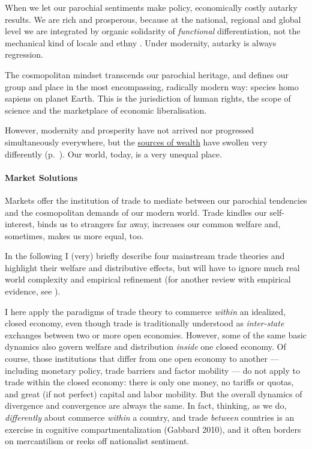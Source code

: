 When we let our parochial sentiments make policy, economically costly autarky results.
We are rich and prosperous, because at the national, regional and global level we are integrated by organic solidarity of \emph{functional} differentiation, not the mechanical kind of locale and ethny \citep{Durkheim-1893-aa}.
Under modernity, autarky is always regression.

The cosmopolitan mindset transcends our parochial heritage, and defines our group and place in the most encompassing, radically modern way:
species homo sapiens on planet Earth.
This is the jurisdiction of human rights, the scope of science and the marketplace of economic liberalisation.

However, modernity and prosperity have not arrived nor progressed simultaneously everywhere, but the  \hyperref[sec:sources-of-wealth]{sources of wealth} have swollen very differently (p.~\pageref{sec:sources-of-wealth}).
Our world, today, is a very unequal place.

\paragraph{Market Solutions}
	\label{sec:trade}
Markets offer the institution of trade to mediate between our parochial tendencies and the cosmopolitan demands of our modern world.
Trade kindles our self-interest, binds us to strangers far away, increases our common welfare and, sometimes, makes us more equal, too.

In the following I (very) briefly describe four mainstream trade theories and highlight their welfare and distributive effects, but will have to ignore much real world complexity and empirical refinement (for another review with empirical evidence, see \citealt{Beckfield2009}).

I here apply the paradigms of trade theory to commerce \emph{within} an idealized, closed economy, even though trade is traditionally understood as \emph{inter-state} exchanges between two or more open economies.
However, some of the same basic dynamics also govern welfare and distribution \emph{inside} one closed economy.
Of course, those institutions that differ from one open economy to another --- including monetary policy, trade barriers and factor mobility --- do not apply to trade within the closed economy:
there is only one money, no tariffs or quotas, and great (if not perfect) capital and labor mobility.
But the overall dynamics of divergence and convergence are always the same.
In fact, thinking, as we do, \emph{differently} about commerce \emph{within} a country, and trade \emph{between} countries is an exercise in cognitive compartmentalization (Gabbard 2010), and it often borders on mercantilism or reeks off nationalist sentiment.


